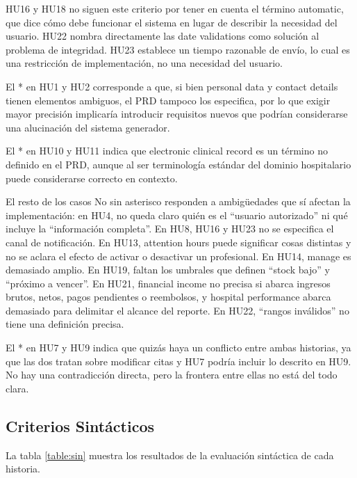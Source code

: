 HU16 y HU18 no siguen este criterio por tener en cuenta el término automatic, que dice cómo debe funcionar el sistema en lugar de describir la necesidad del usuario. 
HU22 nombra directamente las date validations como solución al problema de integridad. HU23 establece un tiempo razonable de envío, lo cual es una restricción de implementación, no una necesidad del usuario.

El * en HU1 y HU2 corresponde a que, si bien personal data y contact details tienen elementos ambiguos, el PRD tampoco los especifica, por lo que exigir mayor precisión implicaría introducir requisitos nuevos que podrían considerarse una alucinación del sistema generador.

El * en HU10 y HU11 indica que electronic clinical record es un término no definido en el PRD, aunque al ser terminología estándar del dominio hospitalario puede considerarse correcto en contexto.

El resto de los casos No sin asterisco responden a ambigüedades que sí afectan la implementación: en HU4, no queda claro quién es el ``usuario autorizado'' ni qué incluye la ``información completa''. En HU8, HU16 y HU23 no se especifica el canal de notificación.
En HU13, attention hours puede significar cosas distintas y no se aclara el efecto de activar o desactivar un profesional. 
En HU14, manage es demasiado amplio. 
En HU19, faltan los umbrales que definen ``stock bajo'' y ``próximo a vencer''. 
En HU21, financial income no precisa si abarca ingresos brutos, netos, pagos pendientes o reembolsos, y hospital performance abarca demasiado para delimitar el alcance del reporte. 
En HU22, ``rangos inválidos'' no tiene una definición precisa.

El * en HU7 y HU9 indica que quizás haya un conflicto entre ambas historias, ya que las dos tratan sobre modificar citas y HU7 podría incluir lo descrito en HU9. No hay una contradicción directa, pero la frontera entre ellas no está del todo clara.

\subsection{Criterios Sintácticos}

La tabla \ref{table:sin} muestra los resultados de la evaluación sintáctica de cada historia.


